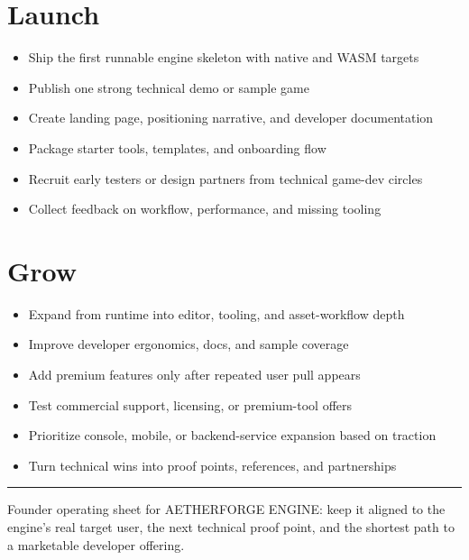 \documentclass[10pt]{article}
\newcommand{\checkitem}[1]{\item[$\square$] #1}
\begin{document}
\begin{minipage}[t]{0.49\textwidth}
\section*{Launch}
\begin{itemize}
    \checkitem{Ship the first runnable engine skeleton with native and WASM targets}
    \checkitem{Publish one strong technical demo or sample game}
    \checkitem{Create landing page, positioning narrative, and developer documentation}
    \checkitem{Package starter tools, templates, and onboarding flow}
    \checkitem{Recruit early testers or design partners from technical game-dev circles}
    \checkitem{Collect feedback on workflow, performance, and missing tooling}
\end{itemize}

\section*{Grow}
\begin{itemize}
    \checkitem{Expand from runtime into editor, tooling, and asset-workflow depth}
    \checkitem{Improve developer ergonomics, docs, and sample coverage}
    \checkitem{Add premium features only after repeated user pull appears}
    \checkitem{Test commercial support, licensing, or premium-tool offers}
    \checkitem{Prioritize console, mobile, or backend-service expansion based on traction}
    \checkitem{Turn technical wins into proof points, references, and partnerships}
\end{itemize}
\end{minipage}

\vfill
\hrule
\vspace{3pt}
{\footnotesize Founder operating sheet for AETHERFORGE ENGINE: keep it aligned to the engine's real target user, the next technical proof point, and the shortest path to a marketable developer offering.}
\end{document}
